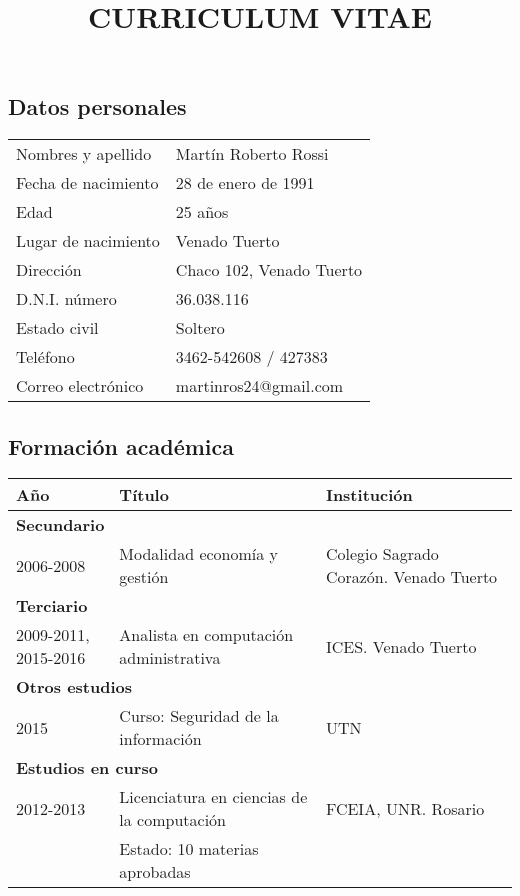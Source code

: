 \documentclass[10pt]{article}
\title{\textbf{CURRICULUM VITAE}}
\date{}
\begin{document}
\maketitle
\subsection*{Datos personales}
\bgroup
\def\arraystretch{1.25}
\begin{tabular}{p{5cm} l}
  Nombres y apellido&Martín Roberto Rossi\\
  Fecha de nacimiento&28 de enero de 1991\\
  Edad&25 años\\
  Lugar de nacimiento&Venado Tuerto\\
  Dirección&Chaco 102, Venado Tuerto\\
  D.N.I. número&36.038.116\\
  Estado civil&Soltero\\
  Teléfono&3462-542608 / 427383\\
  Correo electrónico&martinros24@gmail.com\\
\end{tabular}
\subsection*{Formación académica}
{\centering
  \begin{tabular}{|p{4cm}|p{7cm}|p{4cm}|}
    \hline
    \textbf{Año}&\textbf{Título}&\textbf{Institución}\\ \hline    
    \multicolumn{3}{|l|}{\textbf{Secundario}}\\ \hline
    2006-2008&Modalidad economía y gestión&Colegio Sagrado Corazón. Venado Tuerto\\ \hline
    \multicolumn{3}{|l|}{\textbf{Terciario}}\\ \hline
    2009-2011, 2015-2016&Analista en computación administrativa&ICES. Venado Tuerto\\ \hline
    \multicolumn{3}{|l|}{\textbf{Otros estudios}}\\ \hline
    2015&Curso: Seguridad de la información&UTN\\ \hline
    \multicolumn{3}{|l|}{\textbf{Estudios en curso}}\\ \hline
    2012-2013&Licenciatura en ciencias de la computación&FCEIA, UNR. Rosario\\
                   &Estado: 10 materias aprobadas&\\ \hline
    \end{tabular}
}
\end{document}
